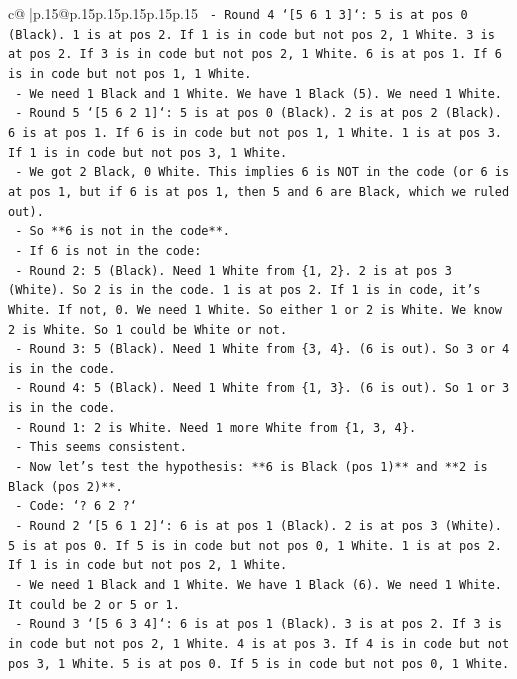 \documentclass{article}
\begin{document}
{\begin{supertabular}{c@{$\;$}|p{.15\linewidth}@{}p{.15\linewidth}p{.15\linewidth}p{.15\linewidth}p{.15\linewidth}p{.15\linewidth}}
{{{\texttt{            {-} Round 4 `{[}5 6 1 3{]}`: 5 is at pos 0 (Black). 1 is at pos 2. If 1 is in code but not pos 2, 1 White. 3 is at pos 2. If 3 is in code but not pos 2, 1 White. 6 is at pos 1. If 6 is in code but not pos 1, 1 White.} \\
\texttt{            {-} We need 1 Black and 1 White. We have 1 Black (5). We need 1 White.} \\
\texttt{            {-} Round 5 `{[}5 6 2 1{]}`: 5 is at pos 0 (Black). 2 is at pos 2 (Black). 6 is at pos 1. If 6 is in code but not pos 1, 1 White. 1 is at pos 3. If 1 is in code but not pos 3, 1 White.} \\
\texttt{            {-} We got 2 Black, 0 White. This implies 6 is NOT in the code (or 6 is at pos 1, but if 6 is at pos 1, then 5 and 6 are Black, which we ruled out).} \\
\texttt{            {-} So **6 is not in the code**.} \\
\texttt{            {-} If 6 is not in the code:} \\
\texttt{                {-} Round 2: 5 (Black). Need 1 White from \{1, 2\}. 2 is at pos 3 (White). So 2 is in the code. 1 is at pos 2. If 1 is in code, it's White. If not, 0. We need 1 White. So either 1 or 2 is White. We know 2 is White. So 1 could be White or not.} \\
\texttt{                {-} Round 3: 5 (Black). Need 1 White from \{3, 4\}. (6 is out). So 3 or 4 is in the code.} \\
\texttt{                {-} Round 4: 5 (Black). Need 1 White from \{1, 3\}. (6 is out). So 1 or 3 is in the code.} \\
\texttt{                {-} Round 1: 2 is White. Need 1 more White from \{1, 3, 4\}.} \\
\texttt{            {-} This seems consistent.} \\
\texttt{            {-} Now let's test the hypothesis: **6 is Black (pos 1)** and **2 is Black (pos 2)**.} \\
\texttt{                {-} Code: `? 6 2 ?`} \\
\texttt{                {-} Round 2 `{[}5 6 1 2{]}`: 6 is at pos 1 (Black). 2 is at pos 3 (White). 5 is at pos 0. If 5 is in code but not pos 0, 1 White. 1 is at pos 2. If 1 is in code but not pos 2, 1 White.} \\
\texttt{                {-} We need 1 Black and 1 White. We have 1 Black (6). We need 1 White. It could be 2 or 5 or 1.} \\
\texttt{                {-} Round 3 `{[}5 6 3 4{]}`: 6 is at pos 1 (Black). 3 is at pos 2. If 3 is in code but not pos 2, 1 White. 4 is at pos 3. If 4 is in code but not pos 3, 1 White. 5 is at pos 0. If 5 is in code but not pos 0, 1 White.} \\
}}}
\end{supertabular}}
\end{document}
